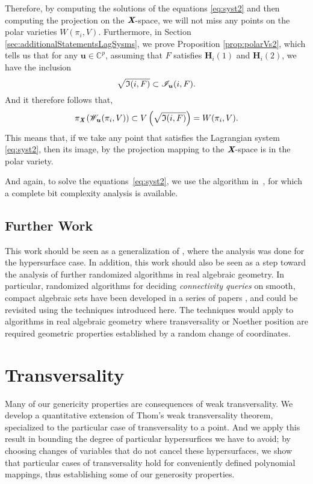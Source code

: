 \documentclass[a4paper]{article}
\def\Xb{\textit{\textbf{X}}}
\def\ub{{\bm u}}
\def\C{\mathbb{C}}
\def\Ii{\mathfrak{I}(i,F)}
\def\Iil{\mathscr{I}_{\ub}(i,F)}
\def\Wil{\mathscr{W}_{\ub}(\pi_i,V)}
\begin{document}
\noindent 
Therefore, by computing the solutions of the equations \ref{eq:syst2} and then computing the projection on the $\Xb$-space, we will not miss any points on the polar varieties $W(\pi_i,V).$ Furthermore, in Section \ref{sec:additionalStatementsLagSysms}, we prove Proposition \ref{prop:polarVs2}, which tells us that for any $\ub \in \C^p$, assuming that $F$ satisfies $\bm H_i(1)$ and $\bm H_i(2)$, we have the inclusion 
    \[
    \sqrt{\frak{I}(i,F)} \subset \Iil.
    \]
And it therefore follows that, 
\[
\pi_{\Xb}\left(\Wil\right) \subset V\left(\sqrt{\Ii}\right) = W(\pi_i,V).
\]
This means that, if we take any point that satisfies the Lagrangian system \ref{eq:syst2}, then its image, by the projection mapping to the $\Xb$-space is in the polar variety. 
\par 
And again, to solve the equations~\eqref{eq:syst2}, we use the algorithm
in~\cite{SH}, for which a complete bit complexity analysis is
available. 



\subsection{Further Work}
This work should be seen as a generalization of \cite{ElGiSh20}, where the analysis was done for the hypersurface case. In addition, this work should also be seen as a step toward the analysis of
further randomized algorithms in real algebraic geometry.  In particular, randomized algorithms for deciding {\em
  connectivity queries} on smooth, compact algebraic sets have been
developed in a series of papers
\cite{SchostMohabBabySteps2011,SchostMohabBabySteps2014}, and could be
revisited using the techniques introduced here. The techniques would apply to algorithms in real algebraic geometry where transversality or Noether position are required geometric properties established by a random change of coordinates.



\section{Transversality}
Many of our genericity properties are consequences of weak transversality. We develop a quantitative extension of Thom’s weak transversality theorem, specialized to the particular case of transversality to a point. And we apply this result in bounding the degree of particular hypersurfices we have to avoid; by choosing changes of variables that do not cancel these hypersurfaces, we show that particular cases of transversality hold for conveniently defined polynomial mappings, thus establishing some of our generosity properties.  
\end{document}

